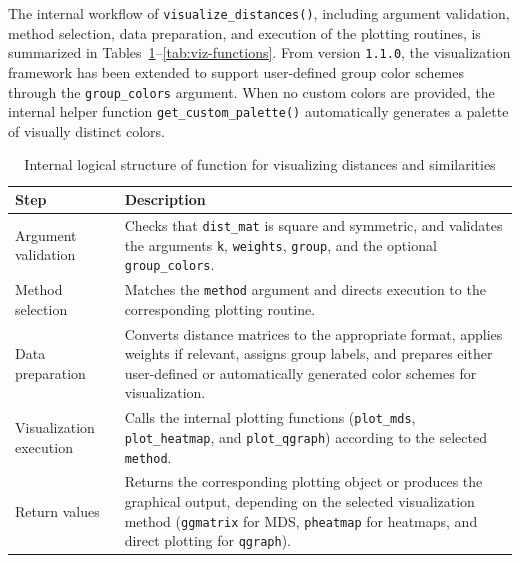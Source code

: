 The internal workflow of \texttt{visualize\_distances()}, including argument validation, method selection, data preparation, and execution of the plotting routines, is summarized in Tables~\ref{tab:viz-logical-structure}--\ref{tab:viz-functions}. From version \texttt{1.1.0}, the visualization framework has been extended to support user-defined group color schemes through the \texttt{group\_colors} argument. When no custom colors are provided, the internal helper function \texttt{get\_custom\_palette()} automatically generates a palette of visually distinct colors.

\begin{table}[h!]
\caption{Internal logical structure of function for visualizing distances and similarities}
\label{tab:viz-logical-structure}
\begin{center}
{\footnotesize
\begin{tabular}{|p{3.5cm}|p{10.2cm}|}
\hline
\textbf{Step} & \textbf{Description} \\
\hline
Argument validation & Checks that \texttt{dist\_mat} is square and symmetric, and validates the arguments \texttt{k}, \texttt{weights}, \texttt{group}, and the optional \texttt{group\_colors}. \\
\hline
Method selection & Matches the \texttt{method} argument and directs execution to the corresponding plotting routine. \\
\hline
Data preparation & Converts distance matrices to the appropriate format, applies weights if relevant, assigns group labels, and prepares either user-defined or automatically generated color schemes for visualization. \\
\hline
Visualization execution & Calls the internal plotting functions (\texttt{plot\_mds}, \texttt{plot\_heatmap}, and \texttt{plot\_qgraph}) according to the selected \texttt{method}.\\
\hline
Return values & Returns the corresponding plotting object or produces the graphical output, depending on the selected visualization method (\texttt{ggmatrix} for MDS, \texttt{pheatmap} for heatmaps, and direct plotting for \texttt{qgraph}). \\
\hline
\end{tabular}}
\end{center}
\end{table}

